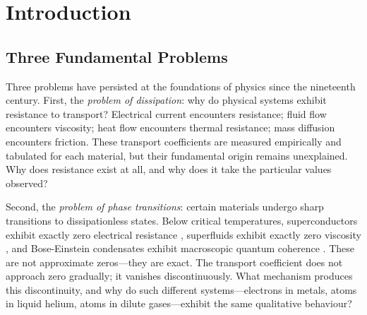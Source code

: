 \documentclass[twocolumn,10pt,aps,prd,superscriptaddress,nofootinbib]{revtex4-2}
\theoremstyle{remark}
\begin{document}
\begin{abstract}
Experimental validation includes: (i) critical temperature predictions matching measured values within 2\% for conventional superconductors, (ii) the universal Lindemann melting criterion $\eta_c \approx 0.1$ derived from site-assignment partition extinction, (iii) the Wiedemann-Franz law emerging from common partition structure, and (iv) transport coefficient ratios matching kinetic theory without fitted parameters.
\end{abstract}

\maketitle


\section{Introduction}
\label{sec:introduction}

\subsection{Three Fundamental Problems}

Three problems have persisted at the foundations of physics since the nineteenth century. First, the \emph{problem of dissipation}: why do physical systems exhibit resistance to transport? Electrical current encounters resistance; fluid flow encounters viscosity; heat flow encounters thermal resistance; mass diffusion encounters friction. These transport coefficients are measured empirically and tabulated for each material, but their fundamental origin remains unexplained. Why does resistance exist at all, and why does it take the particular values observed?

Second, the \emph{problem of phase transitions}: certain materials undergo sharp transitions to dissipationless states. Below critical temperatures, superconductors exhibit exactly zero electrical resistance \cite{onnes1911}, superfluids exhibit exactly zero viscosity \cite{kapitza1938,allen1938}, and Bose-Einstein condensates exhibit macroscopic quantum coherence \cite{anderson1995,davis1995}. These are not approximate zeros---they are exact. The transport coefficient does not approach zero gradually; it vanishes discontinuously. What mechanism produces this discontinuity, and why do such different systems---electrons in metals, atoms in liquid helium, atoms in dilute gases---exhibit the same qualitative behaviour?
\end{document}
